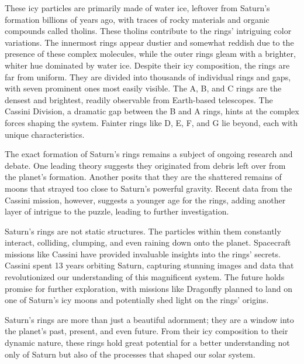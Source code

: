 \documentclass{article}
\begin{document}
These icy particles are primarily made of water ice, leftover from Saturn's formation billions of years ago, with traces of rocky materials and organic compounds called tholins\cite{NASA_Saturn}. These tholins contribute to the rings' intriguing color variations. The innermost rings appear dustier and somewhat reddish due to the presence of these complex molecules, while the outer rings gleam with a brighter, whiter hue dominated by water ice\cite{Britannica_Saturn}. Despite their icy composition, the rings are far from uniform. They are divided into thousands of individual rings and gaps, with seven prominent ones most easily visible. The A, B, and C rings are the densest and brightest, readily observable from Earth-based telescopes\cite{NASA_Saturn}. The Cassini Division, a dramatic gap between the B and A rings, hints at the complex forces shaping the system. Fainter rings like D, E, F, and G lie beyond, each with unique characteristics\cite{Britannica_Saturn}.

The exact formation of Saturn's rings remains a subject of ongoing research and debate. One leading theory suggests they originated from debris left over from the planet's formation\cite{enwiki:1201721965}. Another posits that they are the shattered remains of moons that strayed too close to Saturn's powerful gravity\cite{Britannica_Saturn}. Recent data from the Cassini mission, however, suggests a younger age for the rings, adding another layer of intrigue to the puzzle, leading to further investigation.

Saturn's rings are not static structures. The particles within them constantly interact, colliding, clumping, and even raining down onto the planet\cite{NASA_Saturn}. Spacecraft missions like Cassini have provided invaluable insights into the rings' secrets. Cassini spent 13 years orbiting Saturn, capturing stunning images and data that revolutionized our understanding of this magnificent system\cite{JPL_Cassini}. The future holds promise for further exploration, with missions like Dragonfly planned to land on one of Saturn's icy moons and potentially shed light on the rings' origins\cite{NASA_Dragonfly}.

Saturn's rings are more than just a beautiful adornment; they are a window into the planet's past, present, and even future. From their icy composition to their dynamic nature, these rings hold great potential for a better understanding not only of Saturn but also of the processes that shaped our solar system.
\end{document}
